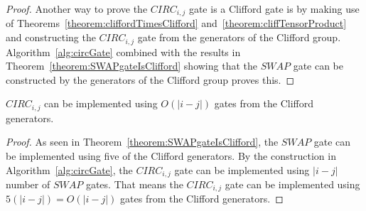 \begin{proof}
Another way to prove the $\mathit{CIRC}_{i,j}$ gate is a Clifford gate is by making use of Theorems~\ref{theorem:cliffordTimesClifford} and~\ref{theorem:cliffTensorProduct} and constructing the $\mathit{CIRC}_{i,j}$ gate from the generators of the Clifford group. Algorithm~\ref{alg:circGate} combined with the results in Theorem~\ref{theorem:SWAPgateIsClifford} showing that the $\mathit{SWAP}$ gate can be constructed by the generators of the Clifford group proves this.
\end{proof}

\begin{corollary}
\label{corollary:circGateCount}
$\mathit{CIRC}_{i,j}$ can be implemented using $O\left(\lvert i - j \rvert \right)$ gates from the Clifford generators.
\end{corollary}
\begin{proof}
As seen in Theorem~\ref{theorem:SWAPgateIsClifford}, the $\mathit{SWAP}$ gate can be implemented using five of the Clifford generators. By the construction in Algorithm~\ref{alg:circGate}, the $\mathit{CIRC}_{i,j}$ gate can be implemented using $\lvert i - j \rvert$ number of $\mathit{SWAP}$ gates. That means the $\mathit{CIRC}_{i,j}$ gate can be implemented using $5(\lvert i - j \rvert) = O\left(\lvert i - j \rvert \right)$ gates from the Clifford generators.
\end{proof}

